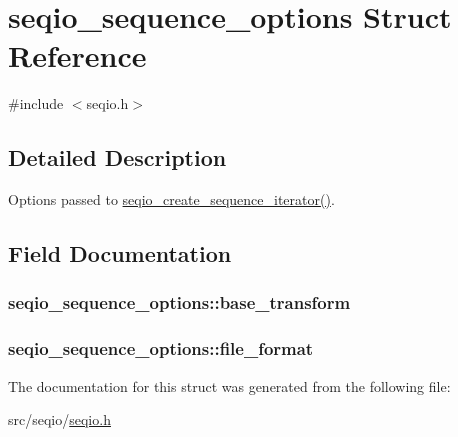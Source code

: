 \hypertarget{structseqio__sequence__options}{\section{seqio\-\_\-sequence\-\_\-options Struct Reference}
\label{structseqio__sequence__options}
}


{\ttfamily \#include $<$seqio.\-h$>$}



\subsection{Detailed Description}
Options passed to \hyperlink{seqio_8h_aacc3f9149ef3c9c82d9d5b12bef5ded2}{seqio\-\_\-create\-\_\-sequence\-\_\-iterator()}. 

\subsection{Field Documentation}
\hypertarget{structseqio__sequence__options_ae99d0129d90950bbfdfbcf8f5413bac4}{
\subsubsection[{base\-\_\-transform}]{ seqio\-\_\-sequence\-\_\-options\-::base\-\_\-transform}}\label{structseqio__sequence__options_ae99d0129d90950bbfdfbcf8f5413bac4}
\hypertarget{structseqio__sequence__options_a634e82cc2eac2036488fcd524434bb1b}{
\subsubsection[{file\-\_\-format}]{ seqio\-\_\-sequence\-\_\-options\-::file\-\_\-format}}\label{structseqio__sequence__options_a634e82cc2eac2036488fcd524434bb1b}


The documentation for this struct was generated from the following file\-:\begin{DoxyCompactItemize}
\item 
src/seqio/\hyperlink{seqio_8h}{seqio.\-h}\end{DoxyCompactItemize}
